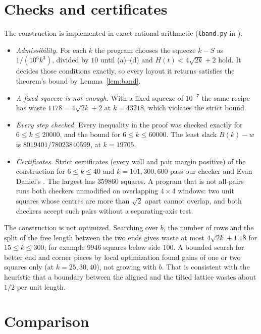 \documentclass[11pt,letterpaper]{amsart}
\theoremstyle{plain}
\theoremstyle{remark}
\begin{document}
\section{Checks and certificates}

The construction is implemented in exact rational arithmetic (\texttt{lband.py} in \cite{Fan26b}).
\begin{itemize}
\item \emph{Admissibility.} For each $k$ the program chooses the squeeze $k-S$ as $1/(10^6k^3)$, divided by $10$ until (a)--(d) and $H(t)<4\sqrt{2k}+2$ hold. It decides those conditions exactly, so every layout it returns satisfies the theorem's bound by Lemma~\ref{lem:band}.
\item \emph{A fixed squeeze is not enough.} With a fixed squeeze of $10^{-7}$ the same recipe has waste $1178=4\sqrt{2k}+2$ at $k=43218$, which violates the strict bound.
\item \emph{Every step checked.} Every inequality in the proof was checked exactly for $6\le k\le20000$, and the bound for $6\le k\le60000$. The least slack $B(k)-w$ is $8019401/78023840599$, at $k=19705$.
\item \emph{Certificates.} Strict certificates (every wall and pair margin positive) of the construction for $6\le k\le40$ and $k=101,300,600$ pass our checker and Evan Daniel's \cite{Dan26}. The largest has $359860$ squares. A program that is not all-pairs runs both checkers unmodified on overlapping $4\times4$ windows: two unit squares whose centres are more than $\sqrt2$ apart cannot overlap, and both checkers accept such pairs without a separating-axis test.
\end{itemize}

The construction is not optimized. Searching over $b$, the number of rows and the split of the free length between the two ends gives waste at most $4\sqrt{2k}+1.18$ for $15\le k\le300$; for example $9946$ squares below side $100$. A bounded search for better end and corner pieces by local optimization found gains of one or two squares only (at $k=25,30,40$), not growing with $b$. That is consistent with the heuristic that a boundary between the aligned and the tilted lattice wastes about $1/2$ per unit length.

\section{Comparison}
\end{document}
